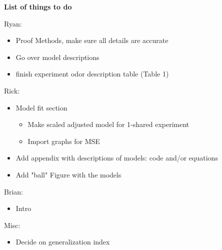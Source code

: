 \textbf{List of things to do}

Ryan:
\begin{itemize}
\item Proof Methods, make sure all details are accurate
\item Go over model descriptions
\item finish experiment odor description table (Table 1)
\end{itemize}
Rick:
\begin{itemize}
\item Model fit section
\begin{itemize}
\finish basic graphs on data/model fit in ipy notebook so Ryan can adjust them for publication
\item Make scaled adjusted model for 1-shared experiment
\item Import graphs for MSE
\end{itemize}

\item Add appendix with descriptions of models: code and/or equations
\item Add "ball" Figure with the models
\end{itemize}

Brian:
\begin{itemize}
\item Intro
\end{itemize}

Misc:
\begin{itemize}
\item Decide on generalization index
\end{itemize}
